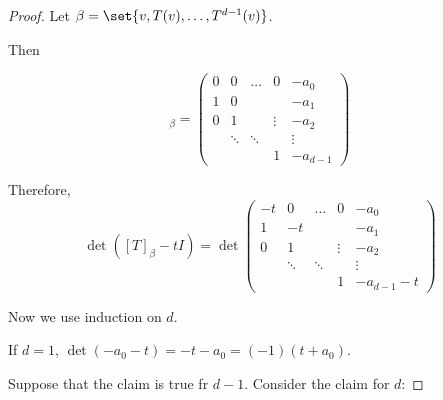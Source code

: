 \documentclass[11pt]{scrartcl}
\begin{document}
\begin{proof}
  Let $\beta = \set{v, T(v), \dots, T^{d-1}(v)}$.

  Then

  \begin{equation*}
    [T]_{\beta} = 
    \begin{pmatrix}
      0 & 0      & \dots  & 0      & -a_0   \\
      1 & 0      &        &        & -a_1   \\
      0 & 1      &        & \vdots & -a_2   \\
        & \ddots & \ddots &        & \vdots \\
        &        &        & 1      & -a_{d-1}
      \end{pmatrix}
    \end{equation*}

    Therefore, 
    \begin{equation*}
      \det ([T]_{\beta} -t I) = 
      \det\begin{pmatrix}
        -t & 0      & \dots  & 0      & -a_0   \\
        1  & -t     &        &        & -a_1   \\
        0  & 1      &        & \vdots & -a_2   \\
           & \ddots & \ddots &        & \vdots \\
           &        &        & 1      & -a_{d-1}-t
         \end{pmatrix}
    \end{equation*}

    Now we use induction on $d$.

    If $d=1$, $\det(-a_0-t) = -t-a_0 = (-1)(t+a_0)$.

    Suppose that the claim is true fr $d-1$. Consider the claim for $d$:


\end{proof}
\end{document}
